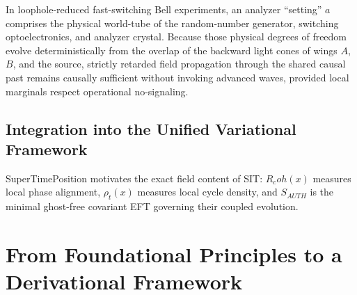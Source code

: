 \documentclass[american,11pt,letterpaper]{article}
\newcommand{\Rcoh}{R_{\mathrm{coh}}}
\def\mathrm#1{#1}%
\def\Rcoh{R_coh}%
\begin{document}
In loophole-reduced fast-switching Bell experiments, an analyzer ``setting'' $a$ comprises the physical world-tube of the random-number generator, switching optoelectronics, and analyzer crystal. Because those physical degrees of freedom evolve deterministically from the overlap of the backward light cones of wings $A$, $B$, and the source, strictly retarded field propagation through the shared causal past remains causally sufficient without invoking advanced waves, provided local marginals respect operational no-signaling.

\subsection{Integration into the Unified Variational Framework}

SuperTimePosition motivates the exact field content of SIT: $\Rcoh(x)$ measures local phase alignment, $\rho_t(x)$ measures local cycle density, and $S_{\mathrm{AUTH}}$ is the minimal ghost-free covariant EFT governing their coupled evolution.

\section{From Foundational Principles to a Derivational Framework}
\label{app:derivational-framework}
\end{document}
